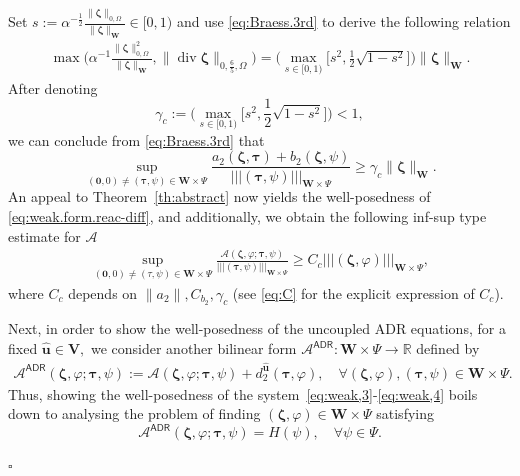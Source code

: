 \documentclass[11pt, reqno, a4paper, twoside]{article}
\newcommand*\tnorm[1]{|\!|\!| #1 |\!|\!|}
\newcommand{\bu}{\boldsymbol{u}}
\newcommand\bzeta{\boldsymbol{\zeta}}
\newcommand\bzero{\boldsymbol{0}}
\newcommand\btau{\boldsymbol{\tau}}
\newcommand{\bW}{\mathbf{W}}
\newcommand{\bV}{\mathbf{V}}
\newcommand{\cA}{\mathcal{A}}
\newcommand\vdiv{\mathop{\mathrm{div}}\nolimits}
\newenvironment{proof}{\noindent{\it Proof.}}{\hfill$\square$}
\numberwithin{equation}{section}
\numberwithin{remark}{section}
\numberwithin{figure}{section}
\numberwithin{table}{section}
\newcommand{\rrb}[1]{{\leavevmode\color{lightgreen}{#1}}}
\newcommand{\rd}[1]{\textcolor{BrickRed}{#1}}
\begin{document}
{\begin{proof}
Set \(s:=\alpha^{-\frac12}\frac{\|\bzeta\|_{0,\Omega}}{\|\bzeta\|_{\bW}}\in[0,1)\) and use \eqref{eq:Braess.3rd} to derive the following  relation 
\begin{align*}\max\bigl({\alpha^{-1}\frac{\|\bzeta\|^2_{0,\Omega}}{\|\bzeta\|_{\bW}},\|\vdiv \bzeta\|_{0,\frac65,\Omega}}\bigr)=\bigl(\max_{s\in[0,1)}\bigl[s^2,{\frac12}\sqrt{1-s^2}\bigr]\bigr) \|\bzeta\|_{\bW}.\end{align*}
After denoting \[\gamma_c:=\bigl(\max_{s\in[0,1)}\bigl[s^2,{\frac12}\sqrt{1-s^2}\bigr]\bigr)<1,\] we can conclude from \eqref{eq:Braess.3rd} that \[\sup_{(\bzero,0)\neq(\btau,\psi)\in\bW\times\Psi}\frac{a_2(\bzeta,\btau)+b_2(\bzeta,\psi)}{\tnorm{(\btau,\psi)}_{\bW\times\Psi}}\geq \gamma_c \|\bzeta\|_{\bW}.\]
An appeal to Theorem~\ref{th:abstract} now yields the well-posedness of \eqref{eq:weak.form.reac-diff}, and additionally, we obtain the following inf-sup type estimate for $\cA$  
\begin{align}\label{eq:A.stab}
\sup_{(\bzero,0)\neq(\tau,\psi)\in\bW\times\Psi}\frac{\cA(\bzeta,\varphi;\btau,\psi)}{\tnorm{(\btau,\psi)}_{\bW\times \Psi}}\geq C_c\tnorm{(\bzeta,\varphi)}_{\bW\times \Psi},
\end{align}
where \(C_c\) depends on \(\|a_2\|,C_{b_2},\gamma_c\) {(see \eqref{eq:C} for the explicit expression of \(C_c\))}.

Next, in order to show the well-posedness of the uncoupled ADR equations, for a fixed \(\hat{\bu}\in\bV,\) we consider another bilinear form \(\mathcal{A}^{\mathsf{ADR}}:\bW\times\Psi\to \mathbb{R}\) defined by 
\begin{align}\label{eq:A:ARD}\mathcal{A}^{\mathsf{ADR}}(\bzeta,\varphi;\btau,\psi):=\mathcal{A}(\bzeta,\varphi;\btau,\psi)+d_2^{\hat{\bu}}(\btau,\varphi),\quad \forall (\bzeta,\varphi), (\btau,\psi)\in\bW\times \Psi.\end{align}
Thus,  showing the well-posedness of the system~\eqref{eq:weak,3}-\eqref{eq:weak,4} boils down to analysing the problem of finding \((\bzeta,\varphi)\in\bW\times \Psi\) satisfying \[\mathcal{A}^{\mathsf{ADR}}(\bzeta,\varphi;\btau,\psi)=H(\psi),\quad \forall \psi\in \Psi.\] 



\end{proof}}
\end{document}
